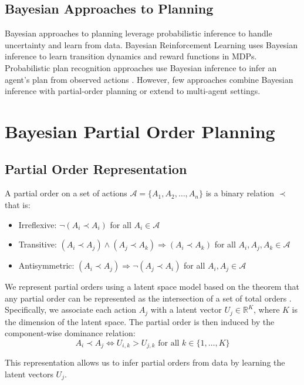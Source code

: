 \documentclass[twocolumn, 10pt]{article}
\begin{document}
\subsection{Bayesian Approaches to Planning}
Bayesian approaches to planning leverage probabilistic inference to handle uncertainty and learn from data. Bayesian Reinforcement Learning \citep{ghavamzadeh2015bayesian} uses Bayesian inference to learn transition dynamics and reward functions in MDPs. Probabilistic plan recognition approaches use Bayesian inference to infer an agent's plan from observed actions \citep{charniak1993bayesian,geib2001recognition}. However, few approaches combine Bayesian inference with partial-order planning or extend to multi-agent settings.

\section{Bayesian Partial Order Planning}

\subsection{Partial Order Representation}
A partial order on a set of actions $\mathcal{A} = \{A_1, A_2, \ldots, A_n\}$ is a binary relation $\prec$ that is:
\begin{itemize}
    \item Irreflexive: $\neg(A_i \prec A_i)$ for all $A_i \in \mathcal{A}$
    \item Transitive: $(A_i \prec A_j) \wedge (A_j \prec A_k) \Rightarrow (A_i \prec A_k)$ for all $A_i, A_j, A_k \in \mathcal{A}$
    \item Antisymmetric: $(A_i \prec A_j) \Rightarrow \neg(A_j \prec A_i)$ for all $A_i, A_j \in \mathcal{A}$
\end{itemize}

We represent partial orders using a latent space model based on the theorem that any partial order can be represented as the intersection of a set of total orders \citep{baker1994partial}. Specifically, we associate each action $A_j$ with a latent vector $U_j \in \mathbb{R}^K$, where $K$ is the dimension of the latent space. The partial order is then induced by the component-wise dominance relation:
\begin{equation}
A_i \prec A_j \iff U_{i,k} > U_{j,k} \text{ for all } k \in \{1, \ldots, K\}
\end{equation}

This representation allows us to infer partial orders from data by learning the latent vectors $U_j$.
\end{document}
